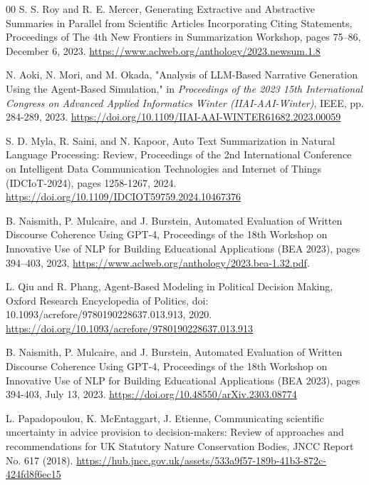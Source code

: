 \documentclass[preprint,12pt]{elsarticle}
\begin{document}
\begin{thebibliography}{00}
S. S. Roy and R. E. Mercer,
Generating Extractive and Abstractive Summaries in Parallel from Scientific Articles Incorporating Citing Statements,
Proceedings of The 4th New Frontiers in Summarization Workshop, pages 75–86,
December 6, 2023.
\href{https://www.aclweb.org/anthology/2023.newsum.1.8}{https://www.aclweb.org/anthology/2023.newsum.1.8}

N. Aoki, N. Mori, and M. Okada,
"Analysis of LLM-Based Narrative Generation Using the Agent-Based Simulation,"
in \textit{Proceedings of the 2023 15th International Congress on Advanced Applied Informatics Winter (IIAI-AAI-Winter)}, IEEE, pp. 284-289, 2023.
\href{https://doi.org/10.1109/IIAI-AAI-WINTER61682.2023.00059}{https://doi.org/10.1109/IIAI-AAI-WINTER61682.2023.00059}


S. D. Myla, R. Saini, and N. Kapoor,
Auto Text Summarization in Natural Language Processing: Review,
Proceedings of the 2nd International Conference on Intelligent Data Communication Technologies and Internet of Things (IDCIoT-2024), pages 1258-1267,
2024.
\href{https://doi.org/10.1109/IDCIOT59759.2024.10467376}{https://doi.org/10.1109/IDCIOT59759.2024.10467376}


B. Naismith, P. Mulcaire, and J. Burstein,
Automated Evaluation of Written Discourse Coherence Using GPT-4,
Proceedings of the 18th Workshop on Innovative Use of NLP for Building Educational Applications (BEA 2023), pages 394–403, 2023,
\href{https://www.aclweb.org/anthology/2023.bea-1.32.pdf}{https://www.aclweb.org/anthology/2023.bea-1.32.pdf}.


L. Qiu and R. Phang,
Agent-Based Modeling in Political Decision Making,
Oxford Research Encyclopedia of Politics,
doi: 10.1093/acrefore/9780190228637.013.913, 2020.
\href{https://doi.org/10.1093/acrefore/9780190228637.013.913}{https://doi.org/10.1093/acrefore/9780190228637.013.913}

B. Naismith, P. Mulcaire, and J. Burstein,
Automated Evaluation of Written Discourse Coherence Using GPT-4,
Proceedings of the 18th Workshop on Innovative Use of NLP for Building Educational Applications (BEA 2023), pages 394-403,
July 13, 2023.
\href{https://doi.org/10.48550/arXiv.2303.08774}{https://doi.org/10.48550/arXiv.2303.08774}


L. Papadopoulou, K. McEntaggart, J. Etienne,
Communicating scientific uncertainty in advice provision to decision-makers: Review of approaches and recommendations for UK Statutory Nature Conservation Bodies,
JNCC Report No. 617 (2018).
\href{https://hub.jncc.gov.uk/assets/533a9f57-189b-41b3-872c-424fd8f6ec15}{https://hub.jncc.gov.uk/assets/533a9f57-189b-41b3-872c-424fd8f6ec15}




\end{thebibliography}
\end{document}
